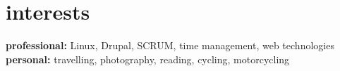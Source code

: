 \documentclass[]{friggeri-cv} %
\begin{document}

\section{interests}

\textbf{professional:} Linux, Drupal, SCRUM, time management, web technologies \\
\textbf{personal:} travelling, photography, reading, cycling, motorcycling
\end{document}
